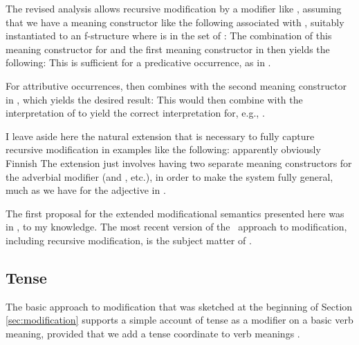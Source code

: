 \documentclass[output=paper,hidelinks]{langscibook}
\begin{document}
The revised analysis allows recursive modification by a
modifier like , assuming that we have a meaning
constructor like the following associated with ,
suitably instantiated to an f-structure where  is in
the  set of :
\ea \label{ex:glue-apparently} 
\z
%
The combination of this meaning constructor for  and
the first meaning constructor in  then yields
the following:
\ea \label{ex:app-finn} 
\z
%
This is sufficient for a predicative occurrence, as in .

For attributive occurrences,  then combines with the
second meaning constructor in , which yields the
desired result:
\ea {}
\z
%
This would then combine with the interpretation of  
to yield the correct interpretation for, e.g., .

I leave aside here the natural extension that is necessary to fully
capture recursive modification in examples like the following:
\ea apparently obviously Finnish 
\z
%
The extension just involves having two separate meaning constructors
for the adverbial modifier  (and ,
etc.), in order to make the system fully general, much as we have for the adjective  in
.

The first proposal for the extended modificational semantics presented
here was in \citet[255--274]{dalrymple01}, to my knowledge. The most recent version
of the \lfgglue\ approach to modification, including recursive
modification, is the subject matter of \citet[ch.\,13]{DLM:LFG}. 

\subsection{Tense}
\label{sec:tense}

The basic approach to modification that was sketched at the beginning
of Section \ref{sec:modification} supports a simple account of tense
as a modifier on a basic verb meaning, provided that we add a tense
coordinate to verb meanings \citep[for a review of approaches to tense
in compositional semantics, see][]{gronn;stechow16}.
\end{document}

